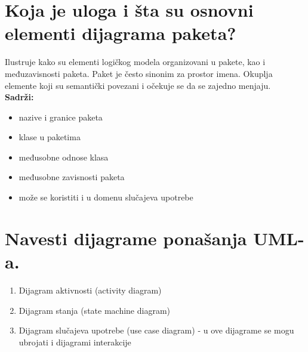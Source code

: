 \documentclass[a4paper]{article}
\begin{document}
\section{Koja je uloga i šta su osnovni elementi dijagrama paketa?}
  Ilustruje kako su elementi logičkog modela organizovani u pakete, kao i međuzavisnosti paketa. 
  Paket je često sinonim za prostor imena. Okuplja elemente koji su semantički povezani 
  i očekuje se da se zajedno menjaju. \\
  \textbf{Sadrži:}
  \begin{itemize}
    \item nazive i granice paketa
    \item klase u paketima
    \item međusobne odnose klasa
    \item međusobne zavisnosti paketa
    \item može se koristiti i u domenu slučajeva upotrebe
  \end{itemize}

\section{Navesti dijagrame ponašanja UML-a.}
  \begin{enumerate}
    \item Dijagram aktivnosti (activity diagram)
    \item Dijagram stanja (state machine diagram)
    \item Dijagram slučajeva upotrebe (use case diagram) 
          - u ove dijagrame se mogu ubrojati i dijagrami interakcije
  \end{enumerate}
\end{document}
